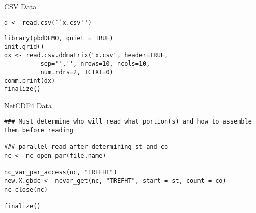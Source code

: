 \begin{frame}
  \begin{exampleblock}{CSV Data}\pause
\begin{lstlisting}[title=Serial Code]
d <- read.csv(``x.csv'')
\end{lstlisting}

\begin{lstlisting}[title=Parallel Code 0\_readcsv.r]
library(pbdDEMO, quiet = TRUE)
init.grid()
dx <- read.csv.ddmatrix("x.csv", header=TRUE,
          sep='','', nrows=10, ncols=10,
          num.rdrs=2, ICTXT=0)
comm.print(dx)
finalize()
\end{lstlisting}
  \end{exampleblock}
\end{frame}

\begin{frame}
  \begin{exampleblock}{NetCDF4 Data}\pause
    \begin{lstlisting}[title=Parallel Read]
### Must determine who will read what portion(s) and how to assemble them before reading

### parallel read after determining st and co
nc <- nc_open_par(file.name)

nc_var_par_access(nc, "TREFHT")
new.X.gbdc <- ncvar_get(nc, "TREFHT", start = st, count = co)
nc_close(nc)

finalize()
    \end{lstlisting}
  \end{exampleblock}
\end{frame}

